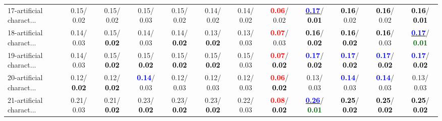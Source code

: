 \begin{table}[h]
\begin{center}
{\begin{tabular}{lc|c|c|c|c|c|c|c|c|c|c}
17-artificial charact... &   0.15/  0.02 &   0.15/  0.02 &   0.15/  0.03 &   0.15/  0.02 &   0.14/  0.02 &   0.14/  0.02 & \textcolor{red}{\textbf{  0.06}}/  0.02 & \underline{\textcolor{blue}{\textbf{  0.17}}}/\textcolor{black}{\textbf{  0.01}} & \textcolor{black}{\textbf{  0.16}}/  0.02 & \textcolor{black}{\textbf{  0.16}}/  0.02 & \textcolor{black}{\textbf{  0.16}}/\textcolor{black}{\textbf{  0.01}} \\
18-artificial charact... &   0.14/  0.03 &   0.15/\textcolor{black}{\textbf{  0.02}} &   0.14/  0.03 &   0.14/\textcolor{black}{\textbf{  0.02}} &   0.13/\textcolor{black}{\textbf{  0.02}} &   0.13/  0.03 & \textcolor{red}{\textbf{  0.07}}/  0.03 & \textcolor{black}{\textbf{  0.16}}/\textcolor{black}{\textbf{  0.02}} & \textcolor{black}{\textbf{  0.16}}/\textcolor{black}{\textbf{  0.02}} & \textcolor{black}{\textbf{  0.16}}/  0.03 & \underline{\textcolor{blue}{\textbf{  0.17}}}/\textcolor{darkgreen}{\textbf{  0.01}} \\
19-artificial charact... &   0.14/  0.03 &   0.15/\textcolor{black}{\textbf{  0.02}} &   0.15/\textcolor{black}{\textbf{  0.02}} &   0.15/\textcolor{black}{\textbf{  0.02}} &   0.15/\textcolor{black}{\textbf{  0.02}} &   0.15/  0.03 & \textcolor{red}{\textbf{  0.07}}/\textcolor{black}{\textbf{  0.02}} & \textcolor{blue}{\textbf{  0.17}}/\textcolor{black}{\textbf{  0.02}} & \textcolor{blue}{\textbf{  0.17}}/\textcolor{black}{\textbf{  0.02}} & \textcolor{blue}{\textbf{  0.17}}/\textcolor{black}{\textbf{  0.02}} & \textcolor{blue}{\textbf{  0.17}}/\textcolor{black}{\textbf{  0.02}} \\
20-artificial charact... &   0.12/\textcolor{black}{\textbf{  0.02}} &   0.12/\textcolor{black}{\textbf{  0.02}} & \textcolor{blue}{\textbf{  0.14}}/  0.03 &   0.12/  0.03 &   0.12/  0.03 &   0.12/  0.03 & \textcolor{red}{\textbf{  0.06}}/\textcolor{black}{\textbf{  0.02}} &   0.13/  0.03 & \textcolor{blue}{\textbf{  0.14}}/  0.03 & \textcolor{blue}{\textbf{  0.14}}/  0.03 &   0.13/  0.03 \\
21-artificial charact... &   0.21/  0.03 &   0.21/\textcolor{black}{\textbf{  0.02}} &   0.23/\textcolor{black}{\textbf{  0.02}} &   0.23/\textcolor{black}{\textbf{  0.02}} &   0.23/\textcolor{black}{\textbf{  0.02}} &   0.22/  0.03 & \textcolor{red}{\textbf{  0.08}}/\textcolor{black}{\textbf{  0.02}} & \underline{\textcolor{blue}{\textbf{  0.26}}}/\textcolor{darkgreen}{\textbf{  0.01}} & \textcolor{black}{\textbf{  0.25}}/\textcolor{black}{\textbf{  0.02}} & \textcolor{black}{\textbf{  0.25}}/\textcolor{black}{\textbf{  0.02}} & \textcolor{black}{\textbf{  0.25}}/\textcolor{black}{\textbf{  0.02}} \\ \hline

\end{tabular}}
\end{center}
\end{table}
